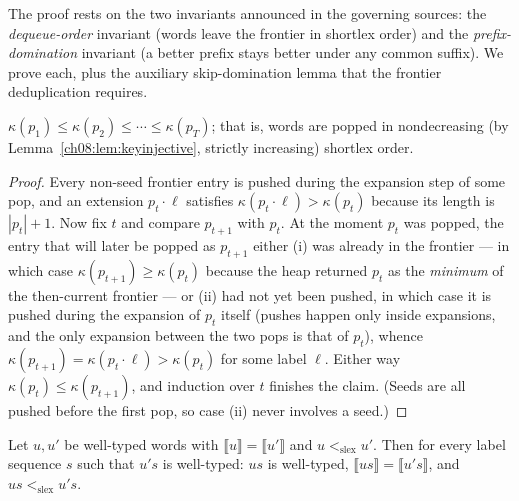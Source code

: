 The proof rests on the two invariants announced in the governing sources:
the \emph{dequeue-order} invariant (words leave the frontier in shortlex
order) and the \emph{prefix-domination} invariant (a better prefix stays
better under any common suffix). We prove each, plus the auxiliary
skip-domination lemma that the frontier deduplication requires.

\begin{lemma}\label{ch08:lem:dequeue}
$\kappa(p_1)\le\kappa(p_2)\le\cdots\le\kappa(p_T)$; that is, words are
popped in nondecreasing (by Lemma~\ref{ch08:lem:keyinjective}, strictly
increasing) shortlex order.
\end{lemma}

\begin{proof}
Every non-seed frontier entry is pushed during the expansion step of some
pop, and an extension $p_t\cdot\ell$ satisfies
$\kappa(p_t\cdot\ell)>\kappa(p_t)$ because its length is $|p_t|+1$. Now fix
$t$ and compare $p_{t+1}$ with $p_t$. At the moment $p_t$ was popped, the
entry that will later be popped as $p_{t+1}$ either (i) was already in the
frontier --- in which case $\kappa(p_{t+1})\ge\kappa(p_t)$ because the heap
returned $p_t$ as the \emph{minimum} of the then-current frontier --- or
(ii) had not yet been pushed, in which case it is pushed during the
expansion of $p_t$ itself (pushes happen only inside expansions, and the
only expansion between the two pops is that of $p_t$), whence
$\kappa(p_{t+1})=\kappa(p_t\cdot\ell)>\kappa(p_t)$ for some label $\ell$.
Either way $\kappa(p_t)\le\kappa(p_{t+1})$, and induction over $t$ finishes
the claim. (Seeds are all pushed before the first pop, so case (ii) never
involves a seed.)
\end{proof}

\begin{lemma}\label{ch08:lem:prefix}
Let $u,u'$ be well-typed words with
$\llbracket u\rrbracket=\llbracket u'\rrbracket$ and
$u<_{\mathrm{slex}}u'$. Then for every label sequence $s$ such that $u's$ is
well-typed: $us$ is well-typed,
$\llbracket us\rrbracket=\llbracket u's\rrbracket$, and
$us<_{\mathrm{slex}}u's$.
\end{lemma}

